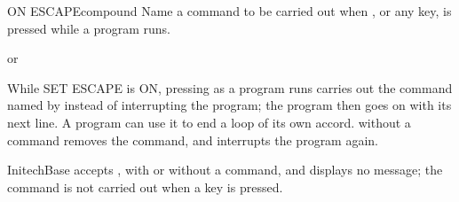 \begin{XbaseEntry}{ON ESCAPE}{compound}
Name a command to be carried out when , or any key, is pressed while
a program runs.
\Syntax
{}
\par or\par
{}
\Usage
While SET ESCAPE is ON, pressing  as a program runs carries out the
command named by  instead of interrupting the program; the
program then goes on with its next line.  A program can use it to end a loop
of its own accord.   without a command removes the command,
and  interrupts the program again.

InitechBase accepts , with or without a command, and displays no
message; the command is not carried out when a key is pressed.
\end{XbaseEntry}

